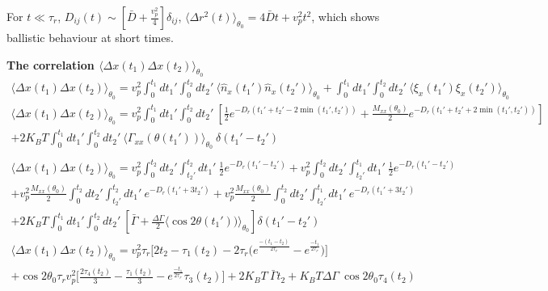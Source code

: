 \documentclass[]{article}
\begin{document}
For $t \ll\tau_r$,
$D_{ij}(t)\sim[\bar D + \frac{ v_p^2}{4}]\delta_{ij}$,
$\langle \Delta r^2(t) \rangle_{\theta_0}=4\bar D t+v_p^2t^2$, which
shows ballistic behaviour at short times.

\textbf{The correlation
$\langle \Delta x(t_1)\Delta x(t_2) \rangle_{\theta_0}$}
\begin{multline*}
\langle \Delta x(t_1)\Delta x(t_2) \rangle_{\theta_0} =v_p^2\int_0^{t_1} dt_1\prime\int_0^{t_2} dt_2\prime \  \langle \hat n_x(t_1\prime) \hat n_x(t_2\prime) \rangle_{\theta_0}+\int_0^{t_1}dt_1\prime\int_0^{t_2} dt_2\prime \  \langle\xi_x(t_1\prime)\xi_x(t_2\prime)\rangle_{\theta_0}
\\\langle \Delta x(t_1)\Delta x(t_2) \rangle_{\theta_0} =v_p^2\int_0^{t_1} dt_1\prime\int_0^{t_2} dt_2\prime \ [ \frac{1}{2}e^{-D_r(t_1\prime+t_2\prime-2 \min(t_1\prime,t_2\prime))}+\frac{M_{xx}(\theta_0)}{2}e^{-D_r(t_1\prime+t_2\prime+2 \min(t_1\prime,t_2\prime))}] \\+ 2K_BT\int_0^{t_1}dt_1\prime\int_0^{t_2} dt_2\prime \  \langle\Gamma_{xx}(\theta (t_1\prime))\rangle_{\theta_0} \ \delta(t_1\prime-t_2\prime)
\end{multline*}
 \newpage
 \begin{multline*}
\\\langle \Delta x(t_1)\Delta x(t_2) \rangle_{\theta_0} =v_p^2\int_0^{t_2} dt_2\prime\int_{t_2\prime}^{t_2} dt_1\prime \  \frac{1}{2}e^{-D_r(t_1\prime-t_2\prime)}+v_p^2\int_0^{t_2} dt_2\prime\int_{t_2\prime}^{t_1} dt_1\prime \  \frac{1}{2}e^{-D_r(t_1\prime-t_2\prime)}\\+v_p^2\frac{M_{xx}(\theta_0)}{2}\int_0^{t_2} dt_2\prime\int_{t_2\prime}^{t_2} dt_1\prime \ e^{-D_r(t_1\prime+3t_2\prime)}+v_p^2\frac{M_{xx}(\theta_0)}{2}\int_0^{t_2} dt_2\prime\int_{t_2\prime}^{t_1} dt_1\prime \ e^{-D_r(t_1\prime+3t_2\prime)}\\+2K_BT\int_0^{t_1}dt_1\prime\int_0^{t_2} dt_2\prime \ [\bar\Gamma  + \frac{\Delta \Gamma}{2} \langle \cos 2 \theta(t_1\prime))\rangle_{\theta_0} ]  \delta(t_1\prime-t_2\prime)
\\\langle \Delta x(t_1)\Delta x(t_2) \rangle_{\theta_0} =v_p^2\tau_r \Bigg[ 2t_2- \tau_1(t_2) -2 \tau_r\Big( e^{\frac{-(t_1-t_2)}{2\tau_r}}-e^{\frac{-t_1}{2\tau_r}} \Big) \Bigg] \\+ \cos 2\theta_0 \tau_r v_p^2\Bigg[\frac{2 \tau_4(t_2)}{3}-\frac{ \tau_1(t_2)}{3}-e^{\frac{-t_1}{2\tau_r}}\tau_3(t_2)\Bigg]
+2 K_B T \ \bar\Gamma t_2+ K_B T \Delta \Gamma  \ \cos 2 \theta_0 \tau_4(t_2)  
\end{multline*}
\end{document}
